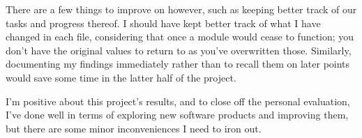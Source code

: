 \vspace{5mm}

There are a few things to improve on however, such as keeping better track of our tasks and progress thereof. 
I should have kept better track of what I have changed in each file, considering that once a module would cease to function; you don't have the original values to return to as you've overwritten those. 
Similarly, documenting my findings immediately rather than to recall them on later points would save some time in the latter half of the project.

\vspace{5mm}

I'm positive about this project's results, and to close off the personal evaluation, I've done well in terms of exploring new software products and improving them, but there are some minor inconveniences I need to iron out.

\newpage
